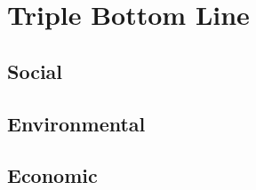 \documentclass[../mthe-493-final-project.tex]{subfiles}
\begin{document}
    \chapter{Triple Bottom Line}
    \label{ch:triple-bottom-line}

    \section{Social}
    \label{sec:social}
    \section{Environmental}
    \label{sec:environmental}
    \section{Economic}
    \label{sec:economic}
\end{document}
